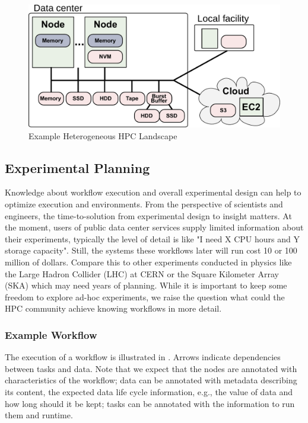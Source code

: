 \documentclass[a4paper, twocolumn]{article}
\begin{document}
\begin{figure}[b]
  \centering
  \includegraphics[width=\columnwidth]{system}
  \caption{Example Heterogeneous HPC Landscape}
  \label{fig:heterogeneous}
\end{figure}



\subsection{Experimental Planning}

Knowledge about workflow execution and overall experimental design can help to
optimize execution and environments.
From the perspective of scientists and engineers, the time-to-solution from experimental design to insight matters.
At the moment, users of public data center services supply limited information about their experiments, typically the level of detail is like "I need X CPU hours and Y storage capacity".
Still, the systems these workflows later will run cost 10 or 100 million of dollars.
Compare this to other experiments conducted in physics like the Large Hadron Collider (LHC) at CERN or the Square Kilometer Array (SKA) which may need years of planning.
While it is important to keep some freedom to explore ad-hoc experiments, we raise the question what could the HPC community achieve knowing workflows in more detail.

\subsubsection{Example Workflow}

The execution of a workflow is illustrated in .
Arrows indicate dependencies between tasks and data.
Note that we expect that the nodes are annotated with characteristics of the workflow;
data can be annotated with metadata describing its content, the expected data life cycle information, e.g., the value of data and how long should it be kept; tasks can be annotated with the information to run them and runtime.
\end{document}
